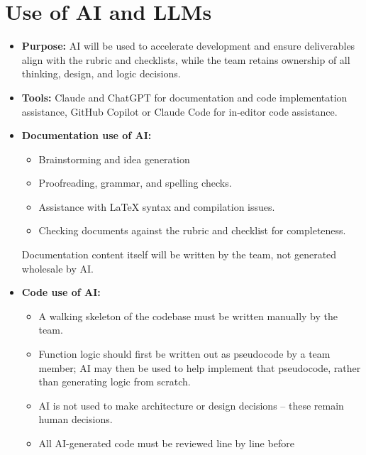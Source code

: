 \documentclass{article}
\begin{document}
\section{Use of AI and LLMs}


\begin{itemize}
    \item \textbf{Purpose:} AI will be used to accelerate development and ensure deliverables align with the rubric and checklists, while the team retains ownership of all thinking, design, and logic decisions.
    \item \textbf{Tools:} Claude and ChatGPT for documentation and code implementation assistance, GitHub Copilot or Claude Code for in-editor code assistance.
    \item \textbf{Documentation use of AI:}
          \begin{itemize}
              \item Brainstorming and idea generation
              \item Proofreading, grammar, and spelling checks.
              \item Assistance with LaTeX syntax and compilation issues.
              \item Checking documents against the rubric and checklist for
                    completeness.
          \end{itemize}
          Documentation content itself will be written by the team, not generated wholesale by AI.
    \item \textbf{Code use of AI:}
          \begin{itemize}
              \item A walking skeleton of the codebase must be written manually
                    by the team.
              \item Function logic should first be written out as pseudocode by
                    a team member; AI may then be used to help implement that
                    pseudocode, rather than generating logic from scratch.
              \item AI is not used to make architecture or design decisions --
                    these remain human decisions.
              \item All AI-generated code must be reviewed line by line before

\end{itemize}
\end{itemize}
\end{document}

